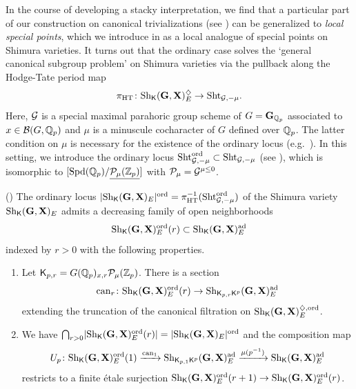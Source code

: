 \documentclass[12pt,reqno]{amsart}
\begin{document}
In the course of developing a stacky interpretation, we find that a particular part of our construction on canonical trivializations (see ) can be generalized to \textit{local special points}, which we introduce in  as a local analogue of special points on Shimura varieties. It turns out that the ordinary case solves the `general canonical subgroup problem' on Shimura varieties via the pullback along the Hodge-Tate period map
\[
    \pi_{\operatorname{HT}} \colon {\operatorname{Sh}}_{{\mathsf{K}}}(\mathbf{G}, \mathbf{X})_E^\diamondsuit \to {\operatorname{Sht}}_{{\mathcal{G}}, -\mu}. 
\]
Here, ${\mathcal{G}}$ is a special maximal parahoric group scheme of $G = \mathbf{G}_{\mathbb{Q}_p}$ associated to $x \in {\mathcal{B}}(G, \mathbb{Q}_p)$ and $\mu$ is a minuscule cocharacter of $G$ defined over $\mathbb{Q}_p$. The latter condition on $\mu$ is necessary for the existence of the ordinary locus (e.g.\ \cite[{}1.6.3]{Wed99}). In this setting, we introduce the ordinary locus ${\operatorname{Sht}}_{{\mathcal{G}}, -\mu}^{\operatorname{ord}} \subset {\operatorname{Sht}}_{{\mathcal{G}}, -\mu}$ (see ), which is isomorphic to $[{\operatorname{Spd}}(\mathbb{Q}_p) / {\underline{{\mathcal{P}}_\mu(\mathbb{Z}_p)}}]$ with ${\mathcal{P}}_\mu = {\mathcal{G}}^{\mu \leq 0}$. 

\begin{prop2}\textup{()} \label{cor2:canonical_filtration}
    The ordinary locus $\lvert {\operatorname{Sh}}_{{\mathsf{K}}}(\mathbf{G}, \mathbf{X})_E\rvert^{{\operatorname{ord}}} = \pi_{\operatorname{HT}}^{-1}({\operatorname{Sht}}_{{\mathcal{G}}, -\mu}^{\operatorname{ord}})$ of the Shimura variety ${\operatorname{Sh}}_{{\mathsf{K}}}(\mathbf{G}, \mathbf{X})_E$ admits a decreasing family of open neighborhoods
    \[
        {\operatorname{Sh}}_{{\mathsf{K}}}(\mathbf{G}, \mathbf{X})_E^{{\operatorname{ord}}}(r) \subset {\operatorname{Sh}}_{{\mathsf{K}}}(\mathbf{G}, \mathbf{X})_E^{\operatorname{ad}}
    \]
    indexed by $r > 0$ with the following properties. 
    \begin{enumerate}
        \item Let ${\mathsf{K}}_{p, r} = G(\mathbb{Q}_p)_{x, r} {\mathcal{P}}_\mu(\mathbb{Z}_p)$.
        There is a section
        \[
            {\operatorname{can}}_r \colon {\operatorname{Sh}}_{{\mathsf{K}}}(\mathbf{G}, \mathbf{X})_E^{{\operatorname{ord}}}(r) \to {\operatorname{Sh}}_{{\mathsf{K}}_{p, r} {\mathsf{K}}^p}(\mathbf{G}, \mathbf{X})_E^{\operatorname{ad}}
        \]
        extending the truncation of the canonical filtration on ${\operatorname{Sh}}_{{\mathsf{K}}}(\mathbf{G}, \mathbf{X})_E^{\diamondsuit, {\operatorname{ord}}}$. 
        \item We have $\bigcap_{r > 0} \lvert {\operatorname{Sh}}_{{\mathsf{K}}}(\mathbf{G}, \mathbf{X})_E^{{\operatorname{ord}}}(r) \rvert = \lvert {\operatorname{Sh}}_{{\mathsf{K}}}(\mathbf{G}, \mathbf{X})_E\rvert^{{\operatorname{ord}}}$ and the composition map
        \[
            U_p \colon {\operatorname{Sh}}_{{\mathsf{K}}}(\mathbf{G}, \mathbf{X})_E^{{\operatorname{ord}}}(1) \xrightarrow{{\operatorname{can}}_1} {\operatorname{Sh}}_{{\mathsf{K}}_{p, 1} {\mathsf{K}}^p}(\mathbf{G}, \mathbf{X})_E^{\operatorname{ad}} \xrightarrow{\mu(p^{-1})} {\operatorname{Sh}}_{{\mathsf{K}}}(\mathbf{G}, \mathbf{X})_E^{\operatorname{ad}}
        \]
        restricts to a finite \'{e}tale surjection ${\operatorname{Sh}}_{{\mathsf{K}}}(\mathbf{G}, \mathbf{X})_E^{{\operatorname{ord}}}(r+1) \to {\operatorname{Sh}}_{{\mathsf{K}}}(\mathbf{G}, \mathbf{X})_E^{{\operatorname{ord}}}(r)$. 
    \end{enumerate}
\end{prop2}
\end{document}
